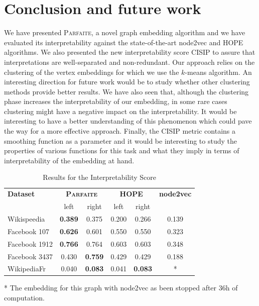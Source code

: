 \section{Conclusion and future work}\label{sec:conclusion}
We have presented \textsc{Parfaite}, a novel graph embedding algorithm and we have evaluated its interpretability against the state-of-the-art node2vec and HOPE algorithms. We also presented the new interpretability score CISIP to assure that interpretations are well-separated and non-redundant.
Our approach relies on the clustering of the vertex embeddings for which we use the $k$-means algorithm. An interesting direction for future work would be to study whether other clustering methods provide better results. We have also seen that, although the clustering phase increases the interpretability of our embedding, in some rare cases clustering might have a negative impact on the interpretability. It would be interesting to have a better understanding of this phenomenon which could pave the way for a more effective approach.  Finally, the CISIP metric contains a smoothing function as a parameter and it would be interesting to study the properties of various functions for this task and what they imply in terms of interpretability of the embedding at hand.

\begin{table}[t]
    \caption{Results for the Interpretability Score}
    \begin{center}
        \begin{tabular}{l|c|c|c|c|c}
            \hline
            \textbf{Dataset} & \multicolumn{2}{|c|}{\textbf{\textsc{Parfaite}}} & \multicolumn{2}{|c|}{\textbf{HOPE}} & \textbf{node2vec}\\
            & left & right & left & right\\
            \hline
Wikispeedia  &  \textbf{0.389} & 0.375 & 0.200 & 0.266 & 0.139\\
Facebook 107 & \textbf{0.626} & 0.601 & 0.550 & 0.550 & 0.323\\
Facebook 1912 & \textbf{0.766} & 0.764 & 0.603 & 0.603 & 0.348\\
Facebook 3437 & 0.430 & \textbf{0.759} & 0.429 & 0.429 & 0.188\\
WikipediaFr  &  0.040 & \textbf{0.083} & 0.041 & \textbf{0.083} & *\\
\hline
        \end{tabular}
    \end{center}
    \label{tab:IS_scores}
    * The embedding for this graph with node2vec as been stopped after 36h of computation.
\end{table}



